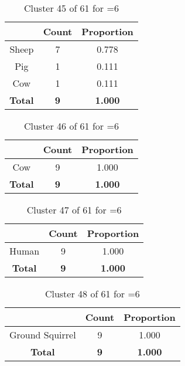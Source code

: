 \begin{table}[ht!]
\centering
\begin{tabular}{|c|c|c|}
\hline
\bf \Spec{} &\bf Count &\bf Proportion\\ \hline \hline
Sheep & 7 & 0.778\\ \hline
Pig & 1 & 0.111\\ \hline
Cow & 1 & 0.111\\ \hline
\hline
\bf Total & \bf 9 & \bf 1.000\\ \hline
\end{tabular}
\label{tab:cluster:45:6}
\caption{Cluster 45 of 61 for \minneigh{}=6}
\end{table}

\begin{table}[ht!]
\centering
\begin{tabular}{|c|c|c|}
\hline
\bf \Spec{} &\bf Count &\bf Proportion\\ \hline \hline
Cow & 9 & 1.000\\ \hline
\hline
\bf Total & \bf 9 & \bf 1.000\\ \hline
\end{tabular}
\label{tab:cluster:46:6}
\caption{Cluster 46 of 61 for \minneigh{}=6}
\end{table}

\begin{table}[ht!]
\centering
\begin{tabular}{|c|c|c|}
\hline
\bf \Spec{} &\bf Count &\bf Proportion\\ \hline \hline
Human & 9 & 1.000\\ \hline
\hline
\bf Total & \bf 9 & \bf 1.000\\ \hline
\end{tabular}
\label{tab:cluster:47:6}
\caption{Cluster 47 of 61 for \minneigh{}=6}
\end{table}

\begin{table}[ht!]
\centering
\begin{tabular}{|c|c|c|}
\hline
\bf \Spec{} &\bf Count &\bf Proportion\\ \hline \hline
Ground Squirrel & 9 & 1.000\\ \hline
\hline
\bf Total & \bf 9 & \bf 1.000\\ \hline
\end{tabular}
\label{tab:cluster:48:6}
\caption{Cluster 48 of 61 for \minneigh{}=6}
\end{table}

